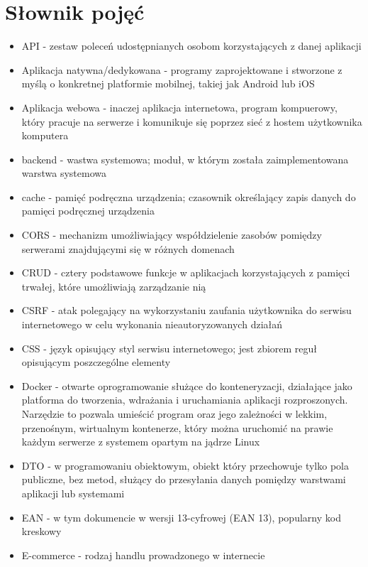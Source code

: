 \documentclass[../main.tex]{subfiles}
\begin{document}
    \section{Słownik pojęć}
    \begin{itemize}
        \item API - zestaw poleceń udostępnianych osobom korzystających z danej aplikacji
        \item Aplikacja natywna/dedykowana - programy zaprojektowane i stworzone z myślą o konkretnej platformie mobilnej, takiej jak Android lub iOS
        \item Aplikacja webowa - inaczej aplikacja internetowa, program kompuerowy, który pracuje na serwerze i komunikuje się poprzez sieć z hostem użytkownika komputera
        \item backend - wastwa systemowa; moduł, w którym została zaimplementowana warstwa systemowa
        \item cache - pamięć podręczna urządzenia; czasownik określający zapis danych do pamięci podręcznej urządzenia
        \item CORS - mechanizm umożliwiający współdzielenie zasobów pomiędzy serwerami znajdującymi się w różnych domenach
        \item CRUD - cztery podstawowe funkcje w aplikacjach korzystających z pamięci trwałej, które umożliwiają zarządzanie nią
        \item CSRF - atak polegający na wykorzystaniu zaufania użytkownika do serwisu internetowego w celu wykonania nieautoryzowanych działań
        \item CSS - język opisujący styl serwisu internetowego; jest zbiorem reguł opisującym poszczególne elementy
        \item Docker\cite{docker} - otwarte oprogramowanie służące do konteneryzacji, działające jako platforma do tworzenia, wdrażania i uruchamiania aplikacji rozproszonych.
        Narzędzie to pozwala umieścić program oraz jego zależności w lekkim, przenośnym, wirtualnym kontenerze, który można uruchomić na prawie każdym serwerze z systemem opartym na jądrze Linux
        \item DTO - w programowaniu obiektowym, obiekt który przechowuje tylko pola publiczne, bez metod, służący do przesyłania danych pomiędzy warstwami aplikacji lub systemami
        \item EAN - w tym dokumencie w wersji 13-cyfrowej (EAN 13), popularny kod kreskowy
        \item E-commerce - rodzaj handlu prowadzonego w internecie

\end{itemize}
\end{document}
